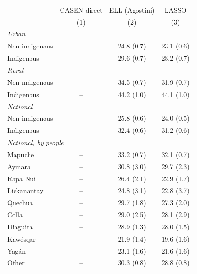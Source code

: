 \begin{tabular}{lccc}
\toprule
 & CASEN direct & ELL (Agostini) & LASSO \\
 & (1) & (2) & (3) \\
\midrule
\multicolumn{4}{l}{\textit{Urban}} \\
\quad Non-indigenous & -- & 24.8 (0.7) & 23.1 (0.6) \\
\quad Indigenous & -- & 29.6 (0.7) & 28.2 (0.7) \\
\multicolumn{4}{l}{\textit{Rural}} \\
\quad Non-indigenous & -- & 34.5 (0.7) & 31.9 (0.7) \\
\quad Indigenous & -- & 44.2 (1.0) & 44.1 (1.0) \\
\multicolumn{4}{l}{\textit{National}} \\
\quad Non-indigenous & -- & 25.8 (0.6) & 24.0 (0.5) \\
\quad Indigenous & -- & 32.4 (0.6) & 31.2 (0.6) \\
\multicolumn{4}{l}{\textit{National, by people}} \\
\quad Mapuche & -- & 33.2 (0.7) & 32.1 (0.7) \\
\quad Aymara & -- & 30.8 (3.0) & 29.7 (2.3) \\
\quad Rapa Nui & -- & 26.4 (2.1) & 22.9 (1.7) \\
\quad Lickanantay & -- & 24.8 (3.1) & 22.8 (3.7) \\
\quad Quechua & -- & 29.7 (1.8) & 27.3 (2.0) \\
\quad Colla & -- & 29.0 (2.5) & 28.1 (2.9) \\
\quad Diaguita & -- & 28.9 (1.3) & 28.0 (1.5) \\
\quad Kaw\'esqar & -- & 21.9 (1.4) & 19.6 (1.6) \\
\quad Yag\'an & -- & 23.1 (1.6) & 21.6 (1.6) \\
\quad Other & -- & 30.3 (0.8) & 28.8 (0.8) \\
\bottomrule
\end{tabular}
